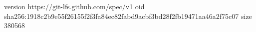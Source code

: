 version https://git-lfs.github.com/spec/v1
oid sha256:1918c2b9e55f26155f2f3fa84ec82fabd9acbf3bd28f2fb19471aa46a2f75c07
size 380568
